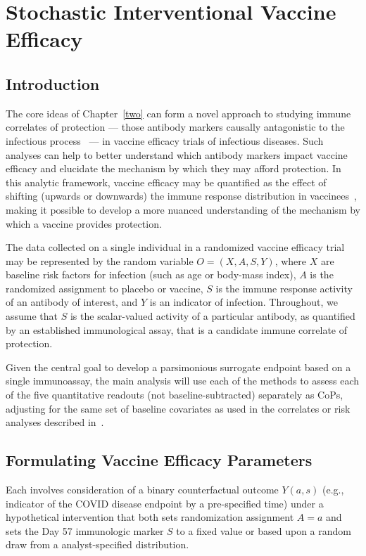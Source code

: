\chapter{Stochastic Interventional Vaccine Efficacy}\label{three}

\section{Introduction}

The core ideas of Chapter~\ref{two} can form a novel approach to studying immune
correlates of protection --- those antibody markers causally antagonistic to the
infectious process~\citep{plotkin2012nomenclature} --- in vaccine efficacy
trials of infectious diseases. Such analyses can help to better understand which
antibody markers impact vaccine efficacy and elucidate the mechanism by which
they may afford protection. In this analytic framework, vaccine efficacy may be
quantified as the effect of shifting (upwards or downwards) the immune response
distribution in vaccinees~\citep{hejazi2020efficient}, making it possible to
develop a more nuanced understanding of the mechanism by which a vaccine
provides protection.

The data collected on a single individual in a randomized vaccine efficacy trial
may be represented by the random variable $O = (X, A, S, Y)$, where $X$ are
baseline risk factors for infection (such as age or body-mass index), $A$ is the
randomized assignment to placebo or vaccine, $S$ is the immune response activity
of an antibody of interest, and $Y$ is an indicator of infection. Throughout, we
assume that $S$ is the scalar-valued activity of a particular antibody, as
quantified by an established immunological assay, that is a candidate immune
correlate of protection.

Given the central goal to
develop a parsimonious surrogate endpoint based on a single immunoassay, the
main analysis will use each of the methods to assess each of the five
quantitative readouts (not baseline-subtracted) separately as CoPs, adjusting
for the same set of baseline covariates as used in the correlates or risk
analyses described in~\citet{gilbert2021covpn}.

\section{Formulating Vaccine Efficacy Parameters}

Each involves consideration of a binary
counterfactual outcome $Y(a,s)$ (e.g., indicator of the COVID disease endpoint
by a pre-specified time) under a hypothetical intervention that both sets
randomization assignment $A=a$ and sets the Day 57 immunologic marker $S$ to
a fixed value or based upon a random draw from a analyst-specified distribution.

